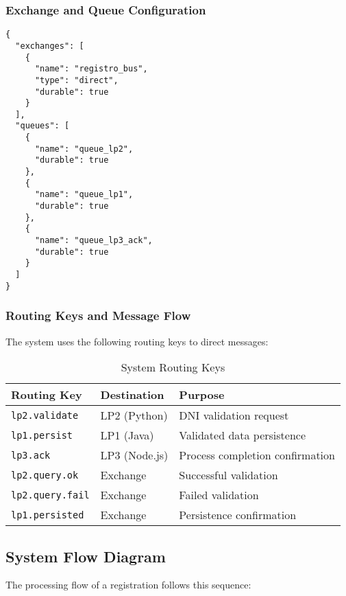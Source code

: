 \documentclass[10pt,a4paper]{article}
\theoremstyle{definition}
\theoremstyle{remark}
\begin{document}
\subsubsection{Exchange and Queue Configuration}

\begin{lstlisting}[style=jsonStyle, caption={RabbitMQ Configuration - Exchange and Queues}]
{
  "exchanges": [
    {
      "name": "registro_bus",
      "type": "direct",
      "durable": true
    }
  ],
  "queues": [
    {
      "name": "queue_lp2",
      "durable": true
    },
    {
      "name": "queue_lp1", 
      "durable": true
    },
    {
      "name": "queue_lp3_ack",
      "durable": true
    }
  ]
}
\end{lstlisting}

\subsubsection{Routing Keys and Message Flow}

The system uses the following routing keys to direct messages:

\begin{table}[H]
\centering
\caption{System Routing Keys}
\begin{tabular}{|l|l|l|}
\hline
\textbf{Routing Key} & \textbf{Destination} & \textbf{Purpose} \\ \hline
\texttt{lp2.validate} & LP2 (Python) & DNI validation request \\ \hline
\texttt{lp1.persist} & LP1 (Java) & Validated data persistence \\ \hline
\texttt{lp3.ack} & LP3 (Node.js) & Process completion confirmation \\ \hline
\texttt{lp2.query.ok} & Exchange & Successful validation \\ \hline
\texttt{lp2.query.fail} & Exchange & Failed validation \\ \hline
\texttt{lp1.persisted} & Exchange & Persistence confirmation \\ \hline
\end{tabular}
\end{table}

\subsection{System Flow Diagram}

The processing flow of a registration follows this sequence:
\end{document}
